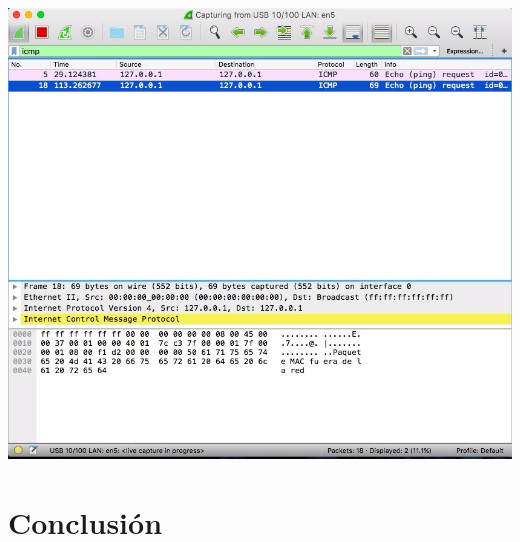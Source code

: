 \documentclass[spanish]{udpreport}
\begin{document}
\begin{center}
	\includegraphics[scale=.37]{imagenes/Hub/Test_3_Wireshark_b.jpg}
\end{center}







\chapter{Conclusión}

\end{document}
